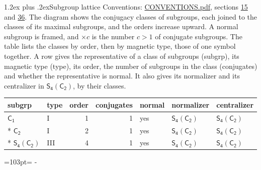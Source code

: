 \documentclass[10pt,a4paper]{article}
\makeatletter
\renewcommand\section{\@startsection{section}{1}{\z@}{-3ex plus -1ex minus -.2ex}%
  {1.2ex plus .2ex}{\normalfont\large\sffamily\bfseries\color{parttitle}}}
\newcommand{\needspace}[1]{\par\penalty-100\begingroup\dimen0=#1\relax\dimen2=\pagegoal
  \advance\dimen2-\pagetotal\ifdim\dimen0>\dimen2\relax\ifdim\dimen2>0pt\vfil\break\fi\fi
  \endgroup}
\numberwithin{equation}{section}
\newcommand{\grp}[1]{\mathsf{#1}}
\makeatother
\begin{document}
\section{Subgroup lattice}\label{s:subgroups}
Conventions: \href{../../CONVENTIONS.pdf}{CONVENTIONS.pdf}, sections \href{../../../rotation/CONVENTIONS.pdf\#conv.15}{15} and \href{../../CONVENTIONS.pdf\#conv.36}{36}.
The diagram shows the conjugacy classes of subgroups, each joined to the classes of its maximal subgroups, and the orders increase upward. \label{n:index.conjugates.c}A normal subgroup is framed, and ${\times}c$ is the number $c > 1$ of conjugate subgroups. The table lists the classes by order, then by magnetic type, those of one symbol together. \label{n:head.subgroup}\label{n:head.magnetic.type}\label{n:head.order}\label{n:head.conjugates}\label{n:head.normal}A row gives the representative of a class of subgroups (subgrp), its magnetic type (type), its order, the number of subgroups in the class (conjugates) and whether the representative is normal. \label{n:head.normalizer}\label{n:head.centralizer}It also gives its normalizer and its centralizer in $\grp{S_{4}}(\grp{C_{2}})$, by their classes. 
\begin{center}
\end{center}
{\small\begin{longtable}{@{}llrrlll@{}}\toprule
subgrp & type & order & conjugates & normal & normalizer & centralizer\\\midrule\endhead
\bottomrule\endfoot\endlastfoot
\href{../../../rotation/data/pdf/C1.pdf}{$\grp{C_{1}}$} & I & 1 & 1 & yes & \href{S4-C2.pdf}{$\grp{S_{4}}(\grp{C_{2}})$} & \href{S4-C2.pdf}{$\grp{S_{4}}(\grp{C_{2}})$}\\*
\href{../../../rotation/data/pdf/C2.pdf}{$\grp{C_{2}}$} & I & 2 & 1 & yes & \href{S4-C2.pdf}{$\grp{S_{4}}(\grp{C_{2}})$} & \href{S4-C2.pdf}{$\grp{S_{4}}(\grp{C_{2}})$}\\*
\href{S4-C2.pdf}{$\grp{S_{4}}(\grp{C_{2}})$} & III & 4 & 1 & yes & \href{S4-C2.pdf}{$\grp{S_{4}}(\grp{C_{2}})$} & \href{S4-C2.pdf}{$\grp{S_{4}}(\grp{C_{2}})$}\\
\bottomrule\end{longtable}}
\needspace{103pt}
\end{document}
